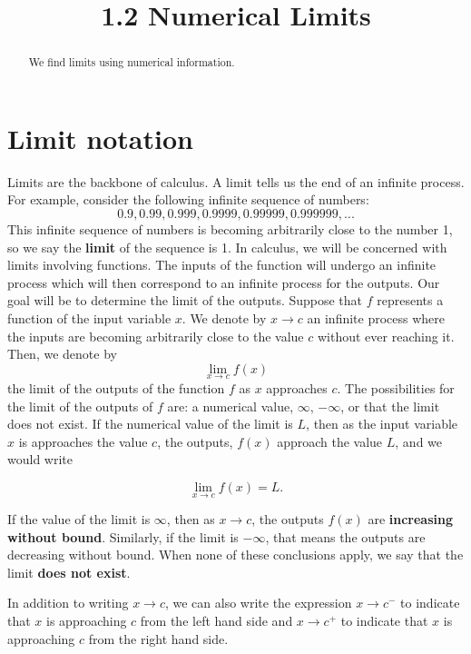 \documentclass{ximera}
\title{1.2 Numerical Limits}
\begin{document}
\begin{abstract}
We find limits using numerical information.
\end{abstract}

\maketitle


\section{Limit notation}
 


Limits are the backbone of calculus. A limit tells us the end of an infinite process. For example, consider the following infinite sequence of numbers:
\[ 0.9, 0.99, 0.999, 0.9999, 0.99999, 0.999999, ... \]
This infinite sequence of numbers is becoming arbitrarily close to the number 1, so we say the \textbf{limit} of the sequence is 1.
In calculus, we will be concerned with limits involving functions.
The inputs of the function will undergo an infinite process which will then correspond to an infinite process for the outputs.  
Our goal will be to determine the limit of the outputs.
Suppose that $f$ represents a function of the input variable $x$.
We denote by $x \to c$ an infinite process where the inputs are becoming arbitrarily close to the value $c$ without ever reaching it.
Then, we denote by
\[ \lim_{x\to c} f(x) \]
the limit of the outputs of the function $f$ as $x$ approaches $c$.
The possibilities for the limit of the outputs of $f$ are: a numerical value, 
$\infty$, $-\infty$, or that the limit does not exist.
If the numerical value of the limit is $L$, then as the input variable $x$ is approaches the value $c$, the outputs, $f(x)$ approach the value $L$, and we would write

\[ 
\lim_{x\to c} f(x) = L.
\]

If the value of the limit is $\infty$, then as $x \to c$, the outputs $f(x)$ are \textbf{increasing without bound}.  
Similarly, if the limit is $-\infty$, that means the outputs are decreasing without bound.
When none of these conclusions apply, we say that the limit \textbf{does not exist}. 

In addition to writing $x \to c$, we can also write the expression
$x \to c^-$ to indicate that $x$ is approaching $c$ from the left hand side and $x \to c^+$ to 
indicate that $x$ is approaching $c$ from the right hand side.
\end{document}
